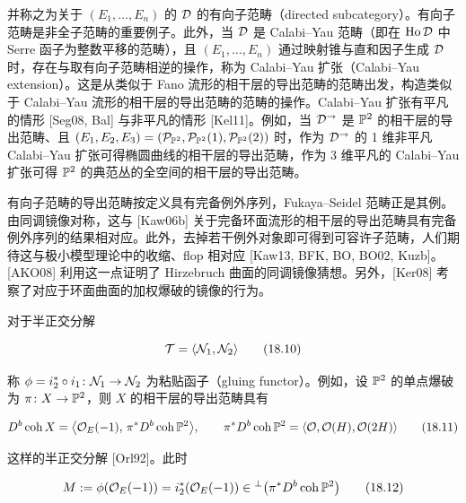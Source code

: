 并称之为关于 $(E_1,\dots,E_n)$ 的 $\mathcal{D}$ 的有向子范畴（directed subcategory）。有向子范畴是非全子范畴的重要例子。此外，当 $\mathcal{D}$ 是 Calabi–Yau 范畴（即在 $\mathrm{Ho}\,\mathcal{D}$ 中 Serre 函子为整数平移的范畴），且 $(E_1,\dots,E_n)$ 通过映射锥与直和因子生成 $\mathcal{D}$ 时，存在与取有向子范畴相逆的操作，称为 Calabi–Yau 扩张（Calabi–Yau extension）。这是从类似于 Fano 流形的相干层的导出范畴的范畴出发，构造类似于 Calabi–Yau 流形的相干层的导出范畴的范畴的操作。Calabi–Yau 扩张有平凡的情形 [Seg08, Bal] 与非平凡的情形 [Kel11]。例如，当 $\mathcal{D}^{\to}$ 是 $\mathbb{P}^{2}$ 的相干层的导出范畴、且 $(E_1,E_2,E_3)=(\mathcal{P}_{\mathbb{P}^{2}},\mathcal{P}_{\mathbb{P}^{2}}(1),\mathcal{P}_{\mathbb{P}^{2}}(2))$ 时，作为 $\mathcal{D}^{\to}$ 的 1 维非平凡 Calabi–Yau 扩张可得椭圆曲线的相干层的导出范畴，作为 3 维平凡的 Calabi–Yau 扩张可得 $\mathbb{P}^{2}$ 的典范丛的全空间的相干层的导出范畴。


有向子范畴的导出范畴按定义具有完备例外序列，Fukaya–Seidel 范畴正是其例。由同调镜像对称，这与 [Kaw06b] 关于完备环面流形的相干层的导出范畴具有完备例外序列的结果相对应。此外，去掉若干例外对象即可得到可容许子范畴，人们期待这与极小模型理论中的收缩、flop 相对应 [Kaw13, BFK, BO, BO02, Kuzb]。[AKO08] 利用这一点证明了 Hirzebruch 曲面的同调镜像猜想。另外，[Ker08] 考察了对应于环面曲面的加权爆破的镜像的行为。

对于半正交分解

\begin{equation}
  \mathcal{T} = \langle \mathcal{N}_1,\mathcal{N}_2 \rangle \tag{18.10}
\end{equation}

称 $\phi = i_2^{*}\circ i_1\colon\mathcal{N}_1\to\mathcal{N}_2$ 为粘贴函子（gluing functor）。例如，设 $\mathbb{P}^{2}$ 的单点爆破为 $\pi\colon X\to\mathbb{P}^{2}$，则 $X$ 的相干层的导出范畴具有

\begin{equation}
  D^{b}\,\mathrm{coh}\,X = \bigl\langle \mathcal{O}_E(-1),\,\pi^{*}D^{b}\,\mathrm{coh}\,\mathbb{P}^{2}\bigr\rangle,
  \qquad
  \pi^{*}D^{b}\,\mathrm{coh}\,\mathbb{P}^{2} = \langle \mathcal{O},\mathcal{O}(H),\mathcal{O}(2H) \rangle \tag{18.11}
\end{equation}

这样的半正交分解 [Orl92]。此时

\begin{equation}
  M := \phi(\mathcal{O}_E(-1)) = i_2^{*}(\mathcal{O}_E(-1)) \in {}^{\perp}\bigl(\pi^{*}D^{b}\,\mathrm{coh}\,\mathbb{P}^{2}\bigr) \tag{18.12}
\end{equation}

